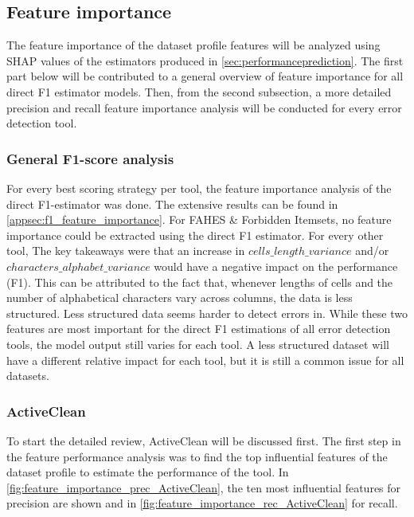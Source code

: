 \subsection{Feature importance}
The feature importance of the dataset profile features will be analyzed using SHAP values of the estimators produced in \autoref{sec:performanceprediction}. The first part below will be contributed to a general overview of feature importance for all direct F1 estimator models. Then, from the second subsection, a more detailed precision and recall feature importance analysis will be conducted for every error detection tool.

\subsubsection{General F1-score analysis}
For every best scoring strategy per tool, the feature importance analysis of the direct F1-estimator was done. The extensive results can be found in \autoref{appsec:f1_feature_importance}. For FAHES \& Forbidden Itemsets, no feature importance could be extracted using the direct F1 estimator.
For every other tool, The key takeaways were that an increase in $cells\_length\_variance$ and/or  $characters\_alphabet\_variance$ would have a negative impact on the performance (F1).
This can be attributed to the fact that, whenever lengths of cells and the number of alphabetical characters vary across columns, the data is less structured. Less structured data seems harder to detect errors in. While these two features are most important for the direct F1 estimations of all error detection tools, the model output still varies for each tool. A less structured dataset will have a different relative impact for each tool, but it is still a common issue for all datasets.


\subsubsection{ActiveClean}
\label{subsubsec:importance_ActiveClean}
To start the detailed review, ActiveClean will be discussed first. The first step in the feature performance analysis was to find the top influential features of the dataset profile to estimate the performance of the tool. In \autoref{fig:feature_importance_prec_ActiveClean}, the ten most influential features for precision are shown and in \autoref{fig:feature_importance_rec_ActiveClean} for recall. 

